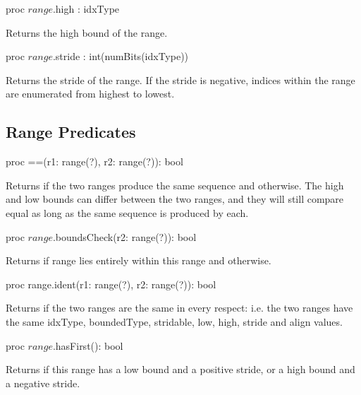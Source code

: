 \begin{protohead}
proc $range$.high : idxType
\end{protohead}
\begin{protobody}
Returns the high bound of the range.
\end{protobody}

\begin{protohead}
proc $range$.stride : int(numBits(idxType))
\end{protohead}
\begin{protobody}
Returns the stride of the range.  If the stride is negative, indices within the
range are enumerated from highest to lowest.
\end{protobody}

\subsection{Range Predicates}

\begin{protohead}
proc ==(r1: range(?), r2: range(?)): bool
\end{protohead}
\begin{protobody}
Returns  if the two ranges produce the same sequence
and  otherwise.  The high and low bounds can differ between the two
ranges, and they will still compare equal as long as the same sequence is
produced by each.
\end{protobody}

\begin{protohead}
proc $range$.boundsCheck(r2: range(?)): bool
\end{protohead}
\begin{protobody}
Returns  if range  lies entirely within this range
and  otherwise.  
\end{protobody}

\begin{protohead}
proc range.ident(r1: range(?), r2: range(?)): bool
\end{protohead}
\begin{protobody}
Returns  if the two ranges are the same in every respect: i.e. the
two ranges have the same idxType,
boundedType, stridable, low, high, stride and
align values.
\end{protobody}

\begin{protohead}
proc $range$.hasFirst(): bool
\end{protohead}
\begin{protobody}
Returns  if this range has a low bound and a positive stride, or a high
bound and a negative stride.
\end{protobody}

